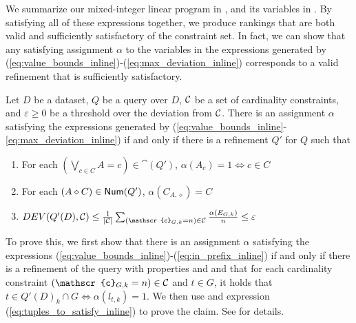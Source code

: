 We summarize our mixed-integer linear program in , and its variables in . %
By satisfying all of these expressions together, we produce rankings that are both valid and sufficiently satisfactory of the constraint set. In fact, we can show that any satisfying assignment $\alpha$ to the variables in the expressions generated by (\ref{eq:value_bounds_inline})-(\ref{eq:max_deviation_inline}) corresponds to a valid refinement that is sufficiently satisfactory.
\begin{theorem}
\label{thm:bounded-deviation}
    Let $D$ be a dataset, $Q$ be a query over $D$, $\mathcal{C}$ be a set of cardinality constraints, and $\varepsilon \geq 0$ be a threshold over the deviation from $\mathcal{C}$. There is an assignment $\alpha$ satisfying the expressions generated by (\ref{eq:value_bounds_inline}-\ref{eq:max_deviation_inline}) if and only if there is a refinement $Q'$ for $Q$ such that 
    \begin{enumerate}[label=\numbercircled{\arabic*}]
        \item For each $(\bigvee_{c \in C} A = c) \in \cat(Q')$, $\alpha(A_c) = 1 \iff c \in C$
        \item For each $(A \diamond C) \in \textsf{Num}(Q')$, $\alpha(C_{A, \diamond}) = C$
        \item $DEV(Q'(D), \constraints) \leq \frac{1}{|\constraints|}\sum_{(\mathscr{c}_{G, k} = n) \in \constraints} \frac{\alpha(E_{G, k})}{n} \leq \varepsilon$
    \end{enumerate}
\end{theorem}

To prove this, we first show that there is an assignment $\alpha$ satisfying the expressions (\ref{eq:value_bounds_inline})-(\ref{eq:in_prefix_inline}) if and only if there is a refinement of the query with properties  and 
  and that for each cardinality constraint $(\mathscr{c}_{G, k} = n) \in \constraints$ and $t \in G$, it holds that $t \in Q'(D)_k \cap G \iff \alpha(l_{t, k}) = 1$. We then use  and expression (\ref{eq:tuples_to_satisfy_inline}) to prove the claim. See \cite{Extended} for details.


